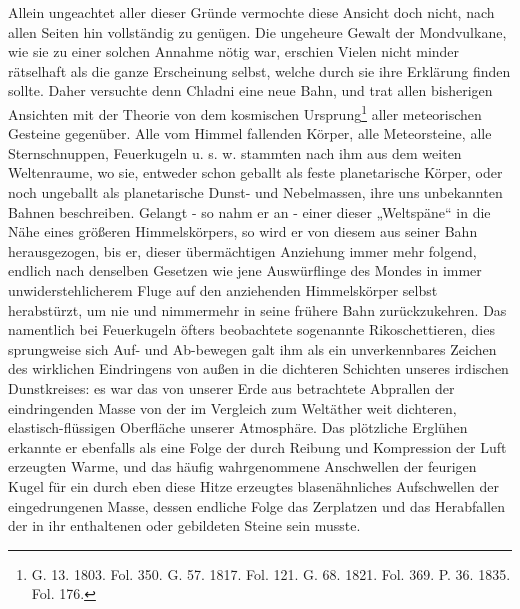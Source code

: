 \documentclass[a4paper, 8pt, oneside, polutonikogreek, german]{article}
\begin{document}
Allein ungeachtet aller dieser Gründe vermochte diese Ansicht doch nicht, nach allen Seiten hin vollständig zu genügen. Die ungeheure Gewalt der Mondvulkane, wie sie zu einer solchen Annahme nötig war, erschien Vielen nicht minder rätselhaft als die ganze Erscheinung selbst, welche durch sie ihre Erklärung finden sollte. Daher versuchte denn Chladni eine neue Bahn, und trat allen bisherigen Ansichten mit der Theorie von dem kosmischen Ursprung\footnote{G. 13. 1803. Fol. 350. G. 57. 1817. Fol. 121. G. 68. 1821. Fol. 369. P. 36. 1835. Fol. 176.} aller meteorischen Gesteine gegenüber. Alle vom Himmel fallenden Körper, alle Meteorsteine, alle Sternschnuppen, Feuerkugeln u. s. w. stammten nach ihm aus dem weiten Weltenraume, wo sie, entweder schon geballt als feste planetarische Körper, oder noch ungeballt als planetarische Dunst- und Nebelmassen, ihre uns unbekannten Bahnen beschreiben. Gelangt - so nahm er an - einer dieser „Weltspäne“ in die Nähe eines größeren Himmelskörpers, so wird er von diesem aus seiner Bahn herausgezogen, bis er, dieser übermächtigen Anziehung immer mehr folgend, endlich nach denselben Gesetzen wie jene Auswürflinge des Mondes in immer unwiderstehlicherem Fluge auf den anziehenden Himmelskörper selbst herabstürzt, um nie und nimmermehr in seine frühere Bahn zurückzukehren. Das namentlich bei Feuerkugeln öfters beobachtete sogenannte Rikoschettieren, dies sprungweise sich Auf- und Ab-bewegen galt ihm als ein unverkennbares Zeichen des wirklichen Eindringens von außen in die dichteren Schichten unseres irdischen Dunstkreises: es war das von unserer Erde aus betrachtete Abprallen der eindringenden Masse von der im Vergleich zum Weltäther weit dichteren, elastisch-flüssigen Oberfläche unserer Atmosphäre. Das plötzliche Erglühen erkannte er ebenfalls als eine Folge der durch Reibung und Kompression der Luft erzeugten Warme, und das häufig wahrgenommene Anschwellen der feurigen Kugel für ein durch eben diese Hitze erzeugtes blasenähnliches Aufschwellen der eingedrungenen Masse, dessen endliche Folge das Zerplatzen und das Herabfallen der in ihr enthaltenen oder gebildeten Steine sein musste.
\end{document}
